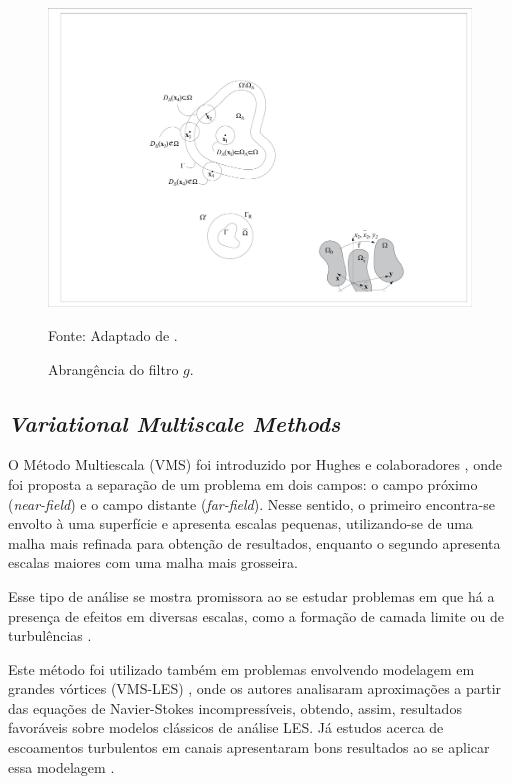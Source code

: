 \documentclass[_ArquivoPrincipal.tex]{subfiles}
\begin{document}
\begin{figure}[h]
    \centering
    \includegraphics[width=0.5\linewidth]{Figuras/AbrFiltro.pdf}
    \caption{Abrangência do filtro $g$.}
    Fonte: Adaptado de .
    \label{fig:AbrFiltro}
\end{figure}

\subsection{\textit{Variational Multiscale Methods}} \label{VMS}

O Método Multiescala (VMS) foi introduzido por Hughes e colaboradores \cite{hughes1995multiscale, hughes1996space, hughes1998variational}, onde foi proposta a separação de um problema em dois campos: o campo próximo (\textit{near-field}) e o campo distante (\textit{far-field}). Nesse sentido, o primeiro encontra-se envolto à uma superfície e apresenta escalas pequenas, utilizando-se de uma malha mais refinada para obtenção de resultados, enquanto o segundo apresenta escalas maiores com uma malha mais grosseira.

Esse tipo de análise se mostra promissora ao se estudar problemas em que há a presença de efeitos em diversas escalas, como a formação de camada limite ou de turbulências \cite{fernandes2020tecnica}.

Este método foi utilizado também em problemas envolvendo modelagem em grandes vórtices (VMS-LES) \cite{hughes2000large, bazilevs2007variational}, onde os autores analisaram aproximações a partir das equações de Navier-Stokes incompressíveis, obtendo, assim, resultados favoráveis sobre modelos clássicos de análise LES. Já estudos acerca de escoamentos turbulentos em canais apresentaram bons resultados ao se aplicar essa modelagem \cite{hughes2002variational}.
\end{document}
